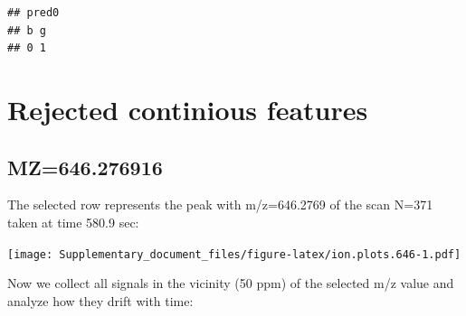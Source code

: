 \documentclass[]{article}
\newenvironment{Shaded}{\begin{snugshade}}{\end{snugshade}}
\newcommand{\KeywordTok}[1]{\textcolor[rgb]{0.13,0.29,0.53}{\textbf{#1}}}
\newcommand{\FloatTok}[1]{\textcolor[rgb]{0.00,0.00,0.81}{#1}}
\newcommand{\StringTok}[1]{\textcolor[rgb]{0.31,0.60,0.02}{#1}}
\newcommand{\OperatorTok}[1]{\textcolor[rgb]{0.81,0.36,0.00}{\textbf{#1}}}
\newcommand{\NormalTok}[1]{#1}
\begin{document}
\begin{verbatim}
## pred0
## b g 
## 0 1
\end{verbatim}

\section{Rejected continious
features}\label{rejected-continious-features}

\subsection{MZ=646.276916}\label{mz646.276916}

\begin{Shaded}
\end{Shaded}

The selected row represents the peak with m/z=646.2769 of the scan N=371
taken at time 580.9 sec:

\begin{Shaded}
\end{Shaded}

\texttt{[image: Supplementary\_document\_files/figure-latex/ion.plots.646-1.pdf]}

Now we collect all signals in the vicinity (50 ppm) of the selected m/z
value and analyze how they drift with time:

\begin{Shaded}
\end{Shaded}
\end{document}
